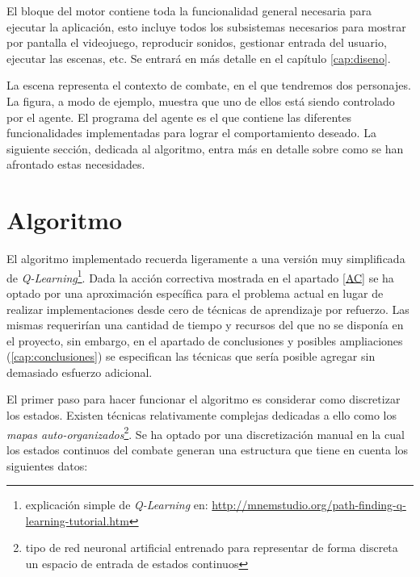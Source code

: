 El bloque del motor contiene toda la funcionalidad general necesaria para ejecutar la aplicación, esto incluye todos los subsistemas necesarios para mostrar por pantalla el videojuego, reproducir sonidos, gestionar entrada del usuario, ejecutar las escenas, etc. Se entrará en más detalle en el capítulo \ref{cap:diseno}.

\bigskip

La escena representa el contexto de combate, en el que tendremos dos personajes. La figura, a modo de ejemplo, muestra que uno de ellos está siendo controlado por el agente. El programa del agente es el que contiene las diferentes funcionalidades implementadas para lograr el comportamiento deseado. La siguiente sección, dedicada al algoritmo, entra más en detalle sobre como se han afrontado estas necesidades.


\section{Algoritmo}

El algoritmo implementado recuerda ligeramente a una versión muy simplificada de \textit{Q-Learning}\footnote{explicación simple de \textit{Q-Learning} en:  \url{http://mnemstudio.org/path-finding-q-learning-tutorial.htm}}. Dada la acción correctiva mostrada en el apartado \ref{AC} se ha optado por una aproximación específica para el problema actual en lugar de realizar implementaciones desde cero de técnicas de aprendizaje por refuerzo. Las mismas requerirían una cantidad de tiempo y recursos del que no se disponía en el proyecto, sin embargo, en el apartado de conclusiones y posibles ampliaciones (\ref{cap:conclusiones}) se especifican las técnicas que sería posible agregar sin demasiado esfuerzo adicional.

\bigskip

El primer paso para hacer funcionar el algoritmo es considerar como discretizar los estados. Existen técnicas relativamente complejas dedicadas a ello como los \textit{mapas auto-organizados}\footnote{tipo de red neuronal artificial entrenado para representar de forma discreta un espacio de entrada de estados continuos}. Se ha optado por una discretización manual en la cual los estados continuos del combate generan una estructura que tiene en cuenta los siguientes datos:

